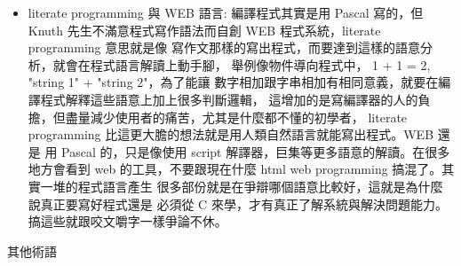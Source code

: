 \begin{itemize}
 command。使用
\begin{verbatim}
\command[optional parameter]{mandatory parameter}
\end{verbatim}
這樣形式。
\item literate programming 與 WEB 語言: 編譯程式其實是用 Pascal 寫的，但 Knuth
先生不滿意程式寫作語法而自創 WEB 程式系統，literate programming 意思就是像
寫作文那樣的寫出程式，而要達到這樣的語意分析，就會在程式語言解讀上動手腳，
舉例像物件導向程式中， 1 + 1 = 2, "string 1" + "string 2"，為了能讓
數字相加跟字串相加有相同意義，就要在編譯程式解釋這些語意上加上很多判斷邏輯，
這增加的是寫編譯器的人的負擔，但盡量減少使用者的痛苦，尤其是什麼都不懂的初學者，
literate programming 比這更大膽的想法就是用人類自然語言就能寫出程式。WEB 還是
用 Pascal 的，只是像使用 script 解譯器，巨集等更多語意的解讀。在很多地方會看到
web 的工具，不要跟現在什麼 html web programming 搞混了。其實一堆的程式語言產生
很多部份就是在爭辯哪個語意比較好，這就是為什麼說真正要寫好程式還是
必須從 C 來學，才有真正了解系統與解決問題能力。搞這些就跟咬文嚼字一樣爭論不休。
\end{itemize}
其他術語
